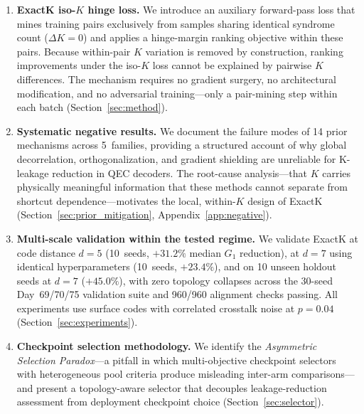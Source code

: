 \begin{enumerate}
\item \textbf{ExactK iso-$K$ hinge loss.} We introduce an auxiliary forward-pass loss that mines training pairs exclusively from samples sharing identical syndrome count ($\Delta K{=}0$) and applies a hinge-margin ranking objective within these pairs. Because within-pair $K$ variation is removed by construction, ranking improvements under the iso-$K$ loss cannot be explained by pairwise $K$ differences. The mechanism requires no gradient surgery, no architectural modification, and no adversarial training---only a pair-mining step within each batch (Section~\ref{sec:method}).

\item \textbf{Systematic negative results.} We document the failure modes of 14 prior mechanisms across 5~families, providing a structured account of why global decorrelation, orthogonalization, and gradient shielding are unreliable for K-leakage reduction in QEC decoders. The root-cause analysis---that $K$ carries physically meaningful information that these methods cannot separate from shortcut dependence---motivates the local, within-$K$ design of ExactK (Section~\ref{sec:prior_mitigation}, Appendix~\ref{app:negative}).

\item \textbf{Multi-scale validation within the tested regime.} We validate ExactK at code distance $d{=}5$ (10~seeds, $+31.2\%$ median $G_1$ reduction), at $d{=}7$ using identical hyperparameters (10~seeds, $+23.4\%$), and on 10 unseen holdout seeds at $d{=}7$ ($+45.0\%$), with zero topology collapses across the 30-seed Day~69/70/75 validation suite and 960/960 alignment checks passing. All experiments use surface codes with correlated crosstalk noise at $p{=}0.04$ (Section~\ref{sec:experiments}).

\item \textbf{Checkpoint selection methodology.} We identify the \emph{Asymmetric Selection Paradox}---a pitfall in which multi-objective checkpoint selectors with heterogeneous pool criteria produce misleading inter-arm comparisons---and present a topology-aware selector that decouples leakage-reduction assessment from deployment checkpoint choice (Section~\ref{sec:selector}).
\end{enumerate}
